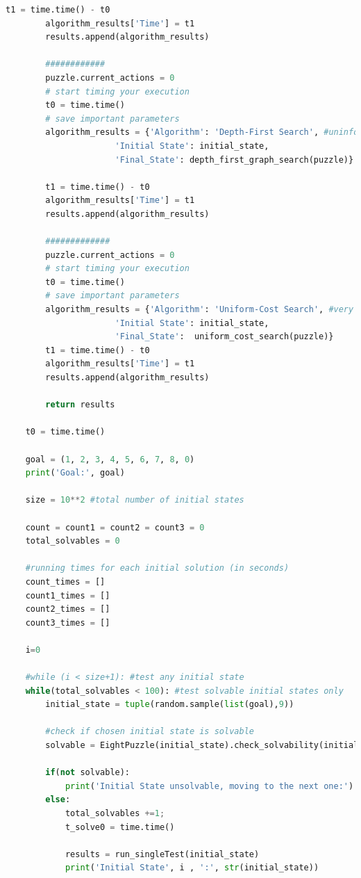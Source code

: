 \documentclass{article}
\begin{document}
\begin{lstlisting}[language=Python, caption=Full Code Listing]
	    t1 = time.time() - t0
	    algorithm_results['Time'] = t1
	    results.append(algorithm_results)
	
	    ############
	    puzzle.current_actions = 0 
	    # start timing your execution
	    t0 = time.time()
	    # save important parameters
	    algorithm_results = {'Algorithm': 'Depth-First Search', #uninformed
		              'Initial State': initial_state,
		              'Final_State': depth_first_graph_search(puzzle)} #breadth_first_search very slow to converge
	
	    t1 = time.time() - t0
	    algorithm_results['Time'] = t1
	    results.append(algorithm_results)
	
	    #############  
	    puzzle.current_actions = 0 
	    # start timing your execution
	    t0 = time.time()
	    # save important parameters
	    algorithm_results = {'Algorithm': 'Uniform-Cost Search', #very slow to converge
		              'Initial State': initial_state, 
		              'Final_State':  uniform_cost_search(puzzle)} 
	    t1 = time.time() - t0
	    algorithm_results['Time'] = t1
	    results.append(algorithm_results)
	
	    return results
	
	t0 = time.time()
	
	goal = (1, 2, 3, 4, 5, 6, 7, 8, 0)
	print('Goal:', goal)
	
	size = 10**2 #total number of initial states
	
	count = count1 = count2 = count3 = 0
	total_solvables = 0
	
	#running times for each initial solution (in seconds)
	count_times = []
	count1_times = []
	count2_times = []
	count3_times = []
	
	i=0
	
	#while (i < size+1): #test any initial state 
	while(total_solvables < 100): #test solvable initial states only
	    initial_state = tuple(random.sample(list(goal),9))
	
	    #check if chosen initial state is solvable 
	    solvable = EightPuzzle(initial_state).check_solvability(initial_state)
	
	    if(not solvable):
	        print('Initial State unsolvable, moving to the next one:')
	    else:
	        total_solvables +=1;       
	        t_solve0 = time.time()
	
	        results = run_singleTest(initial_state)
	        print('Initial State', i , ':', str(initial_state))
	

\end{lstlisting}
\end{document}

